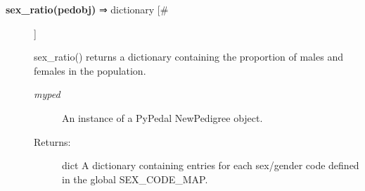 \begin{description}
\item[\textbf{sex\_ratio(pedobj)} ⇒ dictionary [\#]
]
\par sex\_ratio() returns a dictionary containing the proportion of males and females in the population.
\begin{description}
\item[\textit{myped}
]
An instance of a PyPedal NewPedigree object.
\item[Returns:
]
dict A dictionary containing entries for each sex/gender code defined in the global SEX\_CODE\_MAP.
\end{description}\\

\end{description}
